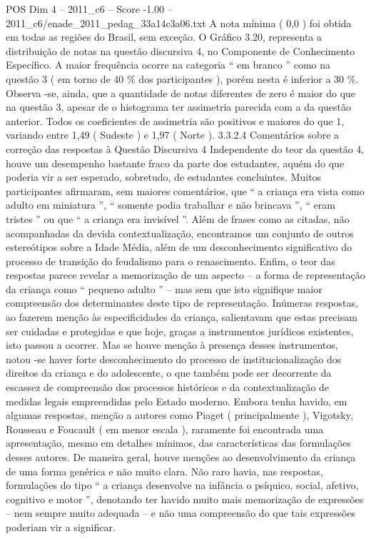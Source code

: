\begin{textsample}{POS Dim 4 – 2011\_c6 – Score -1.00 – 2011\_c6/enade\_2011\_pedag\_33a14c3a06.txt}
A nota mínima ( 0,0 ) foi obtida em todas as regiões do Brasil, sem exceção.
O Gráfico 3.20, representa a distribuição de notas na questão discursiva 4, no Componente de Conhecimento Específico.
A maior frequência ocorre na categoria “ em branco ” como na questão 3 ( em torno de 40 \% dos participantes ), porém nesta é inferior a 30 \%.
Observa -se, ainda, que a quantidade de notas diferentes de zero é maior do que na questão 3, apesar de o histograma ter assimetria parecida com a da questão anterior.
Todos os coeficientes de assimetria são positivos e maiores do que 1, variando entre 1,49 ( Sudeste ) e 1,97 ( Norte ). 3.3.2.4 Comentários sobre a correção das respostas à Questão Discursiva 4 Independente do teor da questão 4, houve um desempenho bastante fraco da parte dos estudantes, aquém do que poderia vir a ser esperado, sobretudo, de estudantes concluintes.
Muitos participantes afirmaram, sem maiores comentários, que “ a criança era vista como adulto em miniatura ”, “ somente podia trabalhar e não brincava ”, “ eram tristes ” ou que “ a criança era invisível ”.
Além de frases como as citadas, não acompanhadas da devida contextualização, encontramos um conjunto de outros estereótipos sobre a Idade Média, além de um desconhecimento significativo do processo de transição do feudalismo para o renascimento.
Enfim, o teor das respostas parece revelar a memorização de um aspecto – a forma de representação da criança como “ pequeno adulto ” – mas sem que isto signifique maior compreensão dos determinantes deste tipo de representação.
Inúmeras respostas, ao fazerem menção às especificidades da criança, salientavam que estas precisam ser cuidadas e protegidas e que hoje, graças a instrumentos jurídicos existentes, isto passou a ocorrer.
Mas se houve menção à presença desses instrumentos, notou -se haver forte desconhecimento do processo de institucionalização dos direitos da criança e do adolescente, o que também pode ser decorrente da escassez de compreensão dos processos históricos e da contextualização de medidas legais empreendidas pelo Estado moderno.
Embora tenha havido, em algumas respostas, menção a autores como Piaget ( principalmente ), Vigotsky, Rousseau e Foucault ( em menor escala ), raramente foi encontrada uma apresentação, mesmo em detalhes mínimos, das características das formulações desses autores.
De maneira geral, houve menções ao desenvolvimento da criança de uma forma genérica e não muito clara.
Não raro havia, nas respostas, formulações do tipo “ a criança desenvolve na infância o psíquico, social, afetivo, cognitivo e motor ”, denotando ter havido muito mais memorização de expressões – nem sempre muito adequada – e não uma compreensão do que tais expressões poderiam vir a significar.

\end{textsample}
